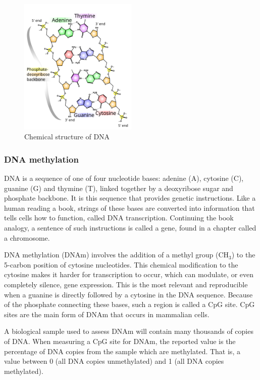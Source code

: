 \documentclass[draft]{article}
\begin{document}
\begin{figure}
    \centering
    \includegraphics[width=0.5\textwidth]{512px-DNA_chemical_structure.svg.png}
    \caption*{Chemical structure of DNA \cite{ball_DNA_structure}}
\end{figure}

\subsubsection{DNA methylation}
DNA is a sequence of one of four nucleotide bases: adenine (A), cytosine (C), guanine (G) and thymine (T), linked together by a deoxyribose sugar and phosphate backbone. It is this sequence that provides genetic instructions. Like a human reading a book, strings of these bases are converted into information that tells cells how to function, called DNA transcription. Continuing the book analogy, a sentence of such instructions is called a gene, found in a chapter called a chromosome.

DNA methylation (DNAm) involves the addition of a methyl group (CH\(_3\)) to the 5-carbon position of cytosine nucleotides. This chemical modification to the cytosine makes it harder for transcription to occur, which can modulate, or even completely silence, gene expression. This is the most relevant and reproducible when a guanine is directly followed by a cytosine in the DNA sequence. Because of the phosphate connecting these bases, such a region is called a CpG site. CpG sites are the main form of DNAm that occurs in mammalian cells.

A biological sample used to assess DNAm will contain many thousands of copies of DNA. When measuring a CpG site for DNAm, the reported value is the percentage of DNA copies from the sample which are methylated. That is, a value between 0 (all DNA copies unmethylated) and 1 (all DNA copies methylated).
\end{document}
